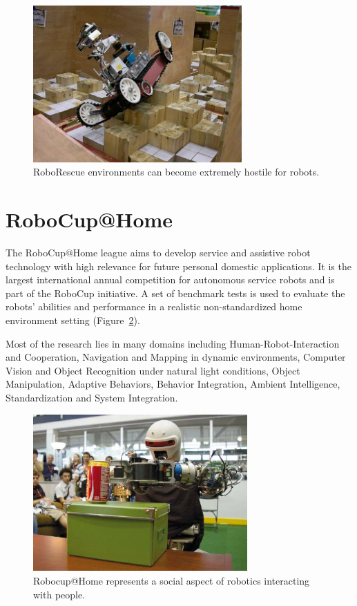 \begin{figure}[h]
	\begin{center}
		\includegraphics[height = 6cm]{Chapter1/figures/roboRescue.jpeg}
 		\caption{RoboRescue environments can become extremely hostile for robots.}
 		\label{fig:roboRescue}
	\end{center}
\end{figure}

\section{RoboCup@Home}

The RoboCup@Home league aims to develop service and assistive robot technology with high relevance for future personal domestic applications. It is the largest international annual competition for autonomous service robots and is part of the RoboCup initiative. A set of benchmark tests is used to evaluate the robots' abilities and performance in a realistic non-standardized home environment setting (Figure~\ref{fig:robocup@home}).

Most of the research lies in many domains including Human-Robot-Interaction and Cooperation, Navigation and Mapping in dynamic environments, Computer Vision and Object Recognition under natural light conditions, Object Manipulation, Adaptive Behaviors, Behavior Integration, Ambient Intelligence, Standardization and System Integration.

\begin{figure}[h]
	\begin{center}
		\includegraphics[height = 6cm]{Chapter1/figures/robocup@home.jpeg}
 		\caption{Robocup@Home represents a social aspect of robotics interacting with people.}
 		\label{fig:robocup@home}
	\end{center}
\end{figure}


